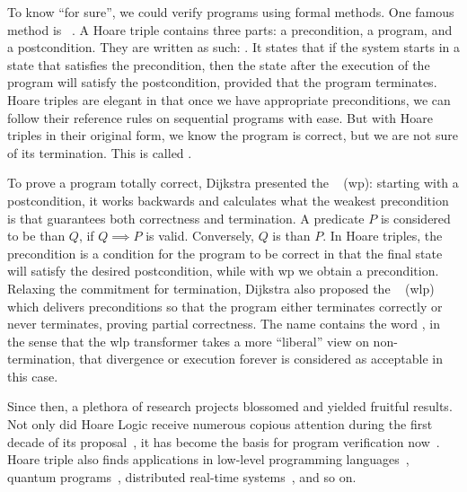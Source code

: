 To know ``for sure'', we could verify programs using formal methods. 
One famous method is ~\cite{hoare69}. 
A Hoare triple contains three parts: a precondition, a program, and a postcondition. 
They are written as such: .
It states that if the system starts in a state that satisfies the precondition, then the state after the execution of the program will satisfy the postcondition, provided that the program terminates.
Hoare triples are elegant in that once we have appropriate preconditions, we can follow their reference rules on sequential programs with ease. 
But with Hoare triples in their original form, we know the program is correct, but we are not sure of its termination. 
This is called . 

To prove a program totally correct, Dijkstra presented the ~\cite{dijkstra75} (wp): starting with a postcondition, it works backwards and calculates what the weakest precondition is that guarantees both correctness and termination. 
A predicate $P$ is considered to be  than $Q$, if $Q\implies P$ is valid. 
Conversely, $Q$ is  than $P$. 
In Hoare triples, the precondition is a  condition for the program to be correct in that the final state will satisfy the desired postcondition, while with wp we obtain a  precondition. 
Relaxing the commitment for termination, Dijkstra also proposed the ~\cite{dijkstra90} (wlp) which delivers preconditions so that the program either terminates correctly or never terminates, proving partial correctness. 
The name contains the word , in the sense that the wlp transformer takes a more ``liberal'' view on non-termination, that divergence or execution forever is considered as acceptable in this case. 

Since then, a plethora of research projects blossomed and yielded fruitful results. 
Not only did Hoare Logic receive numerous copious attention during the first decade of its proposal~\cite{apt81}, it has become the basis for program verification now~\cite{gordon2010ForwardHoare}. 
Hoare triple also finds applications in low-level programming languages~\cite{myreen07}, quantum programs~\cite{zhou19}, distributed real-time systems~\cite{hooman1994extending}, and so on. 

